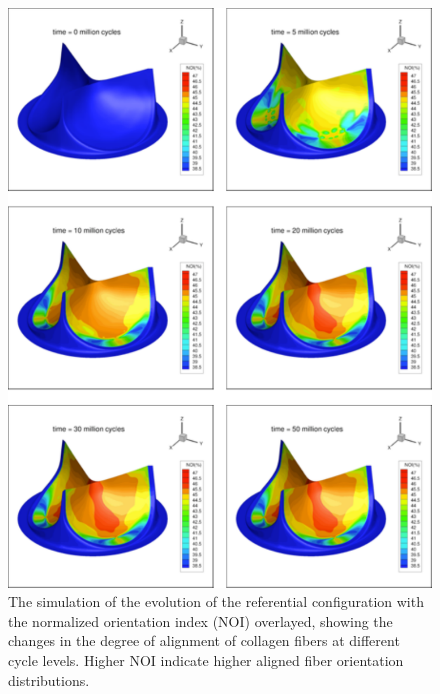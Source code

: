 \begin{figure}
\centering
\includegraphics[width=5in]{Images/chapter6/permanentsetnoi.pdf}
\caption{The simulation of the evolution of the referential configuration with the normalized orientation index (NOI) overlayed, showing the changes in the degree of alignment of collagen fibers at different cycle levels. Higher NOI indicate higher aligned fiber orientation distributions.}
\label{c6:fig:psnoi}
\end{figure}
